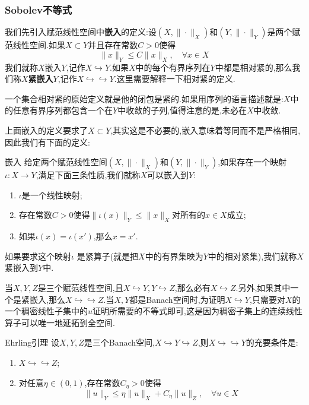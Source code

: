 \subsubsection{Sobolev不等式}
我们先引入赋范线性空间中\textbf{嵌入}的定义:设$(X,\|\cdot\|_{X})$和$(Y,\|\cdot\|_Y)$是两个赋范线性空间.如果$X\subset Y$并且存在常数$C>0$使得
$$
\|x\|_Y\leqslant C\|x\|_X,\quad \forall x\in X
$$
我们就称$X$嵌入$Y$,记作$X\hookrightarrow Y$.如果$X$中的每个有界序列在$Y$中都是相对紧的,那么我们称$X$\textbf{紧嵌入}$Y$,记作$X\hookrightarrow \hookrightarrow Y$.这里需要解释一下相对紧的定义.\par
一个集合相对紧的原始定义就是他的闭包是紧的.如果用序列的语言描述就是:$X$中的任意有界序列都包含一个在$Y$中收敛的子列,值得注意的是,未必在$X$中收敛.\par
上面嵌入的定义要求了$X\subset Y$,其实这是不必要的,嵌入意味着等同而不是严格相同,因此我们有下面的定义:
\begin{Definition}{嵌入}
    给定两个赋范线性空间$(X,\|\cdot\|_{X})$和$(Y,\|\cdot\|_Y)$,如果存在一个映射$\iota :X\to Y$,满足下面三条性质,我们就称$X$可以嵌入到$Y$:
    \begin{enumerate}[nosep,label = (\roman*)]
        \item $\iota $是一个线性映射;
        \item 存在常数$C>0$使得$\|\iota (x)\|_Y\leqslant \|x\|_X$对所有的$x\in X$成立;
        \item 如果$\iota(x)=\iota(x')$,那么$x=x'$.
    \end{enumerate}
    如果要求这个映射$\iota $ 是紧算子(就是把$X$中的有界集映为$Y$中的相对紧集),我们就称$X$紧嵌入到$Y$中.
\end{Definition}
当$X,Y,Z$是三个赋范线性空间,且$X\hookrightarrow Y,Y\hookrightarrow Z$,那么必有$X\hookrightarrow Z$.另外,如果其中一个是紧嵌入,那么$X\hookrightarrow\hookrightarrow Z$.当$X,Y$都是Banach空间时,为证明$X\hookrightarrow Y$,只需要对$X$的一个稠密线性子集中的$u$证明所需要的不等式即可,这是因为稠密子集上的连续线性算子可以唯一地延拓到全空间.
\begin{Theorem}{Ehrling引理}
    设$X,Y,Z$是三个Banach空间,$X\hookrightarrow Y\hookrightarrow Z$,则$X\hookrightarrow\hookrightarrow Y$的充要条件是:
    \begin{enumerate}[nosep,label = (\roman*)]
        \item $X\hookrightarrow\hookrightarrow Z$;
        \item 对任意$\eta\in (0,1)$,存在常数$C_{\eta}>0$使得
              $$
              \|u\|_Y\leqslant \eta\|u\|_{X}+C_{\eta}\|u\|_Z,\quad \forall u\in X
              $$
    \end{enumerate}
\end{Theorem}
